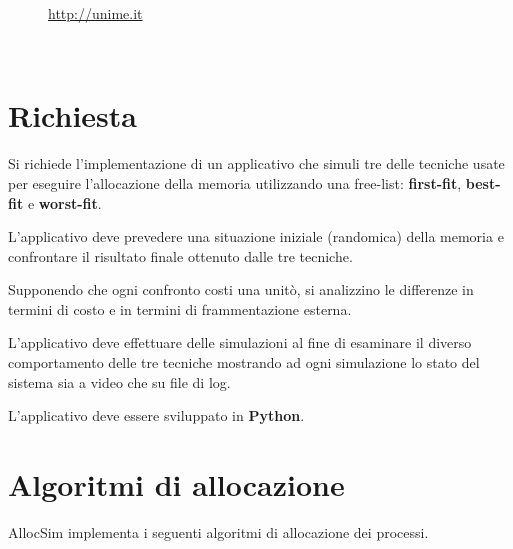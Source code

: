 \documentclass[12pt]{report}
\renewcommand\emph{\textbf}
\begin{document}
\begin{titlepage}
\begin{minipage}{\linewidth}
\begin{minipage}{0.35\linewidth}
\begin{figure}[H]
                    \url{http://unime.it}
                \end{figure}
            \end{minipage}
        \end{minipage}\\[3cm]
    \end{titlepage}

    \newcommand{\atoc}[1]{\addtocontents{toc}{#1\par}}
    \renewcommand{\thesection}{\arabic{section}.}
    \tableofcontents
    \newpage

    \section{Richiesta}
        Si richiede l’implementazione di un applicativo che simuli tre delle tecniche usate per eseguire l’allocazione della memoria utilizzando una free-list: \emph{first-fit}, \emph{best-fit} e \emph{worst-fit}. 

        L’applicativo deve prevedere una situazione iniziale (randomica) della memoria e confrontare il risultato finale ottenuto dalle tre tecniche. 

        Supponendo che ogni confronto costi una unitò, si analizzino le differenze in termini di costo e in termini di frammentazione esterna.         

        L’applicativo deve effettuare delle simulazioni al fine di esaminare il diverso comportamento delle tre tecniche mostrando ad ogni simulazione lo stato del sistema sia a video che su file di log.

        L’applicativo deve essere sviluppato in \emph{Python}.

    \section{Algoritmi di allocazione}
        AllocSim implementa i seguenti algoritmi di allocazione dei processi.
\end{document}
